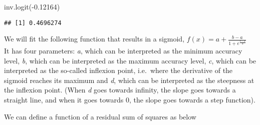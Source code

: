 \documentclass[
]{article}
\newenvironment{Shaded}{\begin{snugshade}}{\end{snugshade}}
\newcommand{\ControlFlowTok}[1]{\textcolor[rgb]{0.13,0.29,0.53}{\textbf{#1}}}
\newcommand{\DecValTok}[1]{\textcolor[rgb]{0.00,0.00,0.81}{#1}}
\newcommand{\DocumentationTok}[1]{\textcolor[rgb]{0.56,0.35,0.01}{\textbf{\textit{#1}}}}
\newcommand{\FloatTok}[1]{\textcolor[rgb]{0.00,0.00,0.81}{#1}}
\newcommand{\FunctionTok}[1]{\textcolor[rgb]{0.00,0.00,0.00}{#1}}
\newcommand{\NormalTok}[1]{#1}
\newcommand{\OtherTok}[1]{\textcolor[rgb]{0.56,0.35,0.01}{#1}}
\newcommand{\SpecialCharTok}[1]{\textcolor[rgb]{0.00,0.00,0.00}{#1}}
\begin{document}
\begin{Shaded}
\begin{Highlighting}[]
\FunctionTok{inv.logit}\NormalTok{(}\SpecialCharTok{{-}}\FloatTok{0.12164}\NormalTok{)}
\end{Highlighting}
\end{Shaded}

\begin{verbatim}
## [1] 0.4696274
\end{verbatim}

We will fit the following function that results in a sigmoid,
\(f(x) = a + \frac {b - a} {1 + e^{\frac {c-x} {d}}}\)\\
It has four parameters: \emph{a}, which can be interpreted as the
minimum accuracy level, \emph{b}, which can be interpreted as the
maximum accuracy level, \emph{c}, which can be interpreted as the
so-called inflexion point, i.e.~where the derivative of the sigmoid
reaches its maximum and \emph{d}, which can be interpreted as the
steepness at the inflexion point. (When \emph{d} goes towards infinity,
the slope goes towards a straight line, and when it goes towards 0, the
slope goes towards a step function).

We can define a function of a residual sum of squares as below

\begin{Shaded}
\end{Shaded}
\end{document}
